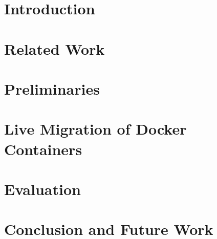 \documentclass[sigconf]{acmart}
\begin{document}


\begin{abstract}

\end{abstract}





\maketitle

% 

\section{Introduction}


\section{Related Work}



\section{Preliminaries}



\section{Live Migration of Docker Containers}



\section{Evaluation}




\section{Conclusion and Future Work}



 
 
\end{document}

